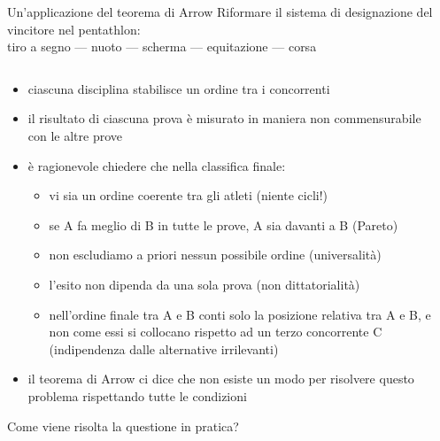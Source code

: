\documentclass[aspectratio=64,11pt]{beamer}
\begin{document}
\begin{frame}{Un'applicazione del teorema di Arrow}
Riformare il sistema di designazione del vincitore nel \alert{pentathlon}: \\[0pt]
tiro a segno --- nuoto --- scherma --- equitazione --- corsa
\begin{columns}
\begin{column}{.8\columnwidth}
\begin{itemize}
\item ciascuna disciplina stabilisce un ordine tra i concorrenti
\item il risultato di ciascuna prova è misurato in maniera non commensurabile con
le altre prove
\item è ragionevole chiedere che nella classifica finale:
\begin{itemize}
\item vi sia un ordine coerente tra gli atleti (niente cicli!)
\item se A fa meglio di B in tutte le prove, A sia davanti a B (Pareto)
\item non escludiamo a priori nessun possibile ordine (universalità)
\item l'esito non dipenda da una sola prova (non dittatorialità)
\item nell'ordine finale tra A e B conti solo la posizione relativa tra A
e B, e non come essi si collocano rispetto ad un terzo concorrente C
(indipendenza dalle alternative irrilevanti)
\end{itemize}
\item il teorema di Arrow ci dice che non esiste un modo per risolvere questo
problema rispettando tutte le condizioni
\end{itemize}
Come viene risolta la questione in pratica?
\end{column}
\begin{column}{.2\columnwidth}
\begin{center}

\end{center}
\end{column}
\end{columns}
\end{frame}
\end{document}
